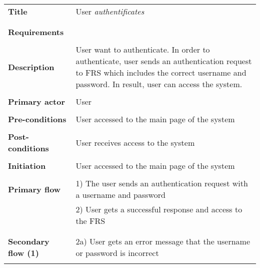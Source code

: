 \documentclass[a4paper,11pt]{article}
\begin{document}
\begin{tabular}{|p{4cm}|p{10cm}|} \hline
	\textbf{Title} &   User \emph{authentificates} 
	
	\\ 
	\\ \hline \rowcolor{Gray} & \\ \hline
	\textbf{Requirements} &    
	\\ \hline \rowcolor{Gray} & \\ \hline
	\textbf{Description} &  User want to authenticate. In order to authenticate, user sends an authentication request to FRS which includes the correct username and password. In result, user can access the system.
	
	\\ \hline \rowcolor{Gray} & \\ \hline
	
	\textbf{Primary actor} & User  
	
	\\ \hline \rowcolor{Gray} & \\ \hline 
	
	\textbf{Pre-conditions} &   User accessed to the main page of the system
	
	\\ \hline \rowcolor{Gray} & \\ \hline
	
	\textbf{Post-conditions} &   User receives access to the system
	
	\\ \hline \rowcolor{Gray} & \\ \hline 
	
	\textbf{Initiation} & User accessed to the main page of the system
	
	\\ \hline \rowcolor{Gray} & \\ \hline 
	
	\textbf{Primary flow} & 
	1) The user sends an authentication request with a username and password  \\&
	2) User gets a successful response and access to the FRS \\&
	
	\\ \hline \rowcolor{Gray} & \\ \hline 
	
	\textbf{Secondary flow (1)} & 
	2a) User gets an error message that the username or password is incorrect \\& 
	
	
	\\ \hline  
\end{tabular}
\end{document}
